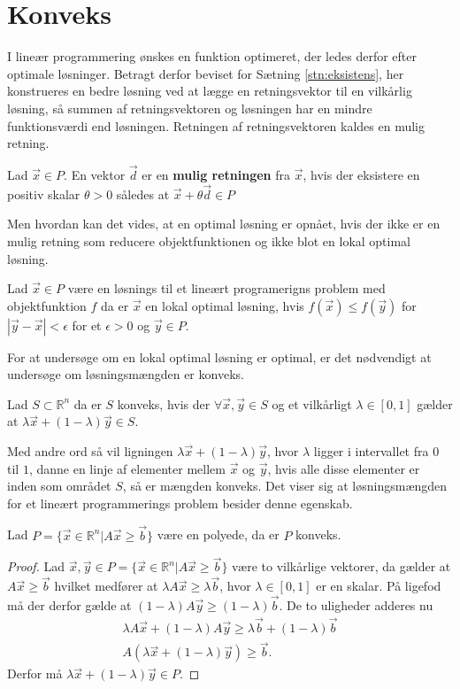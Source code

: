 \section{Konveks}
I lineær programmering ønskes en funktion optimeret, der ledes derfor efter optimale løsninger.
Betragt derfor beviset for Sætning \ref{stn:eksistens}, her konstrueres en bedre løsning ved at lægge en retningsvektor til en vilkårlig løsning, så summen af retningsvektoren og løsningen har en mindre funktionsværdi end løsningen. 
Retningen af retningsvektoren kaldes en mulig retning.
\begin{defn}
Lad $\vec{x} \in P$. En vektor $\vec{d}$ er en \textbf{mulig retningen} fra $\vec{x}$, hvis der eksistere en positiv skalar $\theta > 0$ således at $\vec{x}+\theta\vec{d} \in P$ 
\end{defn}
Men hvordan kan det vides, at en optimal løsning er opnået, hvis der ikke er en mulig retning som reducere objektfunktionen og ikke blot en lokal optimal løsning.
\begin{defn}
Lad $\vec{x} \in P$ være en løsnings til et lineært programerigns problem med objektfunktion $f$ da er $\vec{x}$ en lokal optimal løsning, hvis $f(\vec{x}) \leq f(\vec{y})$ for $|\vec{y}-\vec{x}|< \epsilon$ for et $\epsilon > 0$ og $\vec{y} \in P$.
\end{defn}
For at undersøge om en lokal optimal løsning er optimal, er det nødvendigt at undersøge om løsningsmængden er konveks.
\begin{defn} 
Lad $S \subset \mathds{R}^n$  da er $S$ konveks, hvis der $\forall \vec{x}, \vec{y} \in S$ og et vilkårligt $\lambda \in [0,1]$ gælder at $\lambda \vec{x} + (1-\lambda) \vec{y} \in S$.
\label{def:Konveks}
\end{defn}
Med andre ord så vil ligningen $\lambda \vec{x} + (1-\lambda) \vec{y}$, hvor $\lambda$ ligger i intervallet fra $0$ til $1$, danne en linje af elementer mellem $\vec{x}$ og $\vec{y}$, hvis alle disse elementer er inden som området $S$, så er mængden konveks.
Det viser sig at løsningsmængden for et lineært programmerings problem besider denne egenskab.
\begin{stn}
Lad $P =\{ \vec{x} \in \mathds{R}^n | A \vec{x} \geq \vec{b}\} $ være en polyede, da er $P$ konveks.
\label{stn:polykon}
\end{stn}
\begin{proof}
Lad $\vec{x}, \vec{y} \in P=\{ \vec{x} \in \mathds{R}^n | A \vec{x} \geq \vec{b}\}$ være to vilkårlige vektorer, da gælder at $A\vec{x} \geq \vec{b}$ hvilket medfører at $\lambda A \vec{x} \geq \lambda\vec{b}$, hvor $\lambda \in [0,1]$ er en skalar. 
På ligefod må der derfor gælde at $(1-\lambda)A\vec{y} \geq (1-\lambda)\vec{b}$.
De to uligheder adderes nu
\begin{align*}
\lambda A \vec{x} + (1-\lambda) A \vec{y} \geq \lambda \vec{b} + (1 - \lambda) \vec{b}
\\  A (\lambda\vec{x} + (1-\lambda)\vec{y}) \geq \vec{b}.
\end{align*}
Derfor må $\lambda\vec{x} + (1-\lambda)\vec{y} \in P$.
\end{proof}
